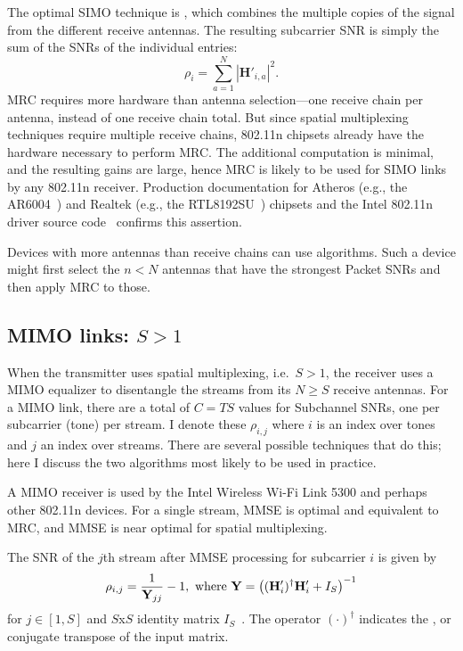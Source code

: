 The optimal SIMO technique is , which combines the multiple copies of the signal from the different receive antennas. The resulting subcarrier SNR is simply the sum of the SNRs of the individual entries:
\begin{equation}
	\label{eq:mrc}
	\rho_i = \sum_{a=1}^N \left| \mathbf{H}'_{i,a} \right|^2.
\end{equation}
MRC requires more hardware than antenna selection---one receive chain per antenna, instead of one receive chain total. But since spatial multiplexing techniques require multiple receive chains, 802.11n chipsets already have the hardware necessary to perform MRC. The additional computation is minimal, and the resulting gains are large, hence MRC is likely to be used for SIMO links by any 802.11n receiver. Production documentation for Atheros (e.g., the AR6004~\cite{ar6004}) and Realtek (e.g., the RTL8192SU~\cite{rtl8192su}) chipsets and the Intel 802.11n driver source code~\cite{iwlwifi} confirms this assertion.

Devices with more antennas than receive chains can use  algorithms. Such a device might first select the $n < N$ antennas that have the strongest Packet SNRs and then apply MRC to those.

\subsection{MIMO links: $S>1$}
When the transmitter uses spatial multiplexing, i.e.\ $S>1$, the receiver uses a MIMO equalizer to disentangle the streams from its $N\geq S$ receive antennas. For a MIMO link, there are a total of $C=TS$ values for Subchannel SNRs, one per subcarrier (tone) per stream. I denote these $\rho_{i,j}$ where $i$ is an index over tones and $j$ an index over streams. There are several possible techniques that do this; here I discuss the two algorithms most likely to be used in practice.

A  MIMO receiver is used by the Intel Wireless Wi-Fi Link 5300 and perhaps other 802.11n devices. For a single stream, MMSE is optimal and equivalent to MRC, and MMSE is near optimal for spatial multiplexing.

The SNR of the $j$th stream after MMSE processing for subcarrier $i$ is given by
\begin{equation}
\centering
\label{eq:mmse_snr}
\rho_{i,j} = \frac{1}{\mathbf{Y}_{jj}}-1, \text{ where }
\mathbf{Y} = \left((\mathbf{H}'_i)^\dagger \mathbf{H}'_i+I_S\right)^{-1}
\end{equation}
for $j \in [1,S]$ and $S$x$S$ identity matrix $I_S$~\cite{Tse}. The operator $(\cdot)^\dagger$ indicates the , or conjugate transpose of the input matrix.

